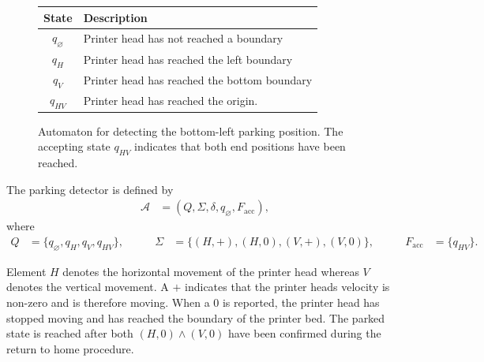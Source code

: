 \documentclass[a4paper,11pt]{article}
\begin{document}
\begin{figure}[H]
\begin{minipage}{0.45\linewidth}
\begin{tikzpicture}
        \end{tikzpicture}
        \caption{Automaton for detecting the bottom-left parking position.
        The accepting state $q_{HV}$ indicates that both end positions
        have been reached.}
        \label{fig:parked-automaton}
    \end{minipage}
    \hfill
    \begin{minipage}{0.4\linewidth}
        \vspace{0pt}
        \centering
        \captionsetup{width=\linewidth,font=small}

        \label{tab:automaton-states}
        \small
        \renewcommand{\arraystretch}{1.2}
        \begin{tabularx}{\linewidth}{
            @{}c >{\raggedright\arraybackslash}X@{}
        }
            \toprule
            \textbf{State} & \textbf{Description} \\
            \midrule
            $q_{\varnothing}$ & Printer head has not reached a boundary\\
            $q_H$ & Printer head has reached the left boundary \\
            $q_V$ & Printer head has reached the bottom boundary \\
            $q_{HV}$ & Printer head has reached the origin. \\
            \bottomrule
        \end{tabularx}
    \end{minipage}
\end{figure}

The parking detector is defined by
\begin{align}
\mathcal{A}&=(Q,\Sigma,\delta,q_{\varnothing},F_{\mathrm{acc}}),
\end{align}
where
\begin{equation}
\begin{aligned}
    Q&=\{q_{\varnothing},q_H,q_V,q_{HV}\},
    &\qquad
    \Sigma  &= \{(H,+),(H,0),(V,+),(V,0)\},
    &\qquad
    F_{\mathrm{acc}}&=\{q_{HV}\}.
\end{aligned}
\end{equation}

Element $H$ denotes the horizontal movement of the printer head whereas $V$ denotes the vertical movement. A $+$ indicates that the printer heads velocity is non-zero and is therefore moving. When a $0$ is reported, the printer head has stopped moving and has reached the boundary of the printer bed. The parked state is reached after both $(H,0) \land (V,0)$ have been confirmed during the return to home procedure.
\end{document}
